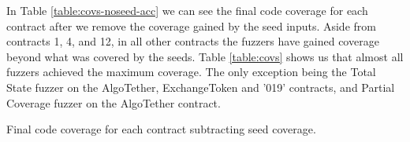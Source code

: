 In Table \ref{table:covs-noseed-acc} we can see the final code coverage for each contract after we remove the coverage gained by the seed inputs.
Aside from contracts 1, 4, and 12, in all other contracts the fuzzers have gained coverage beyond what was covered by the seeds.
Table \ref{table:covs} shows us that almost all fuzzers achieved the maximum coverage.
The only exception being the Total State fuzzer on the AlgoTether, ExchangeToken and '019' contracts, and Partial Coverage fuzzer on the AlgoTether contract.


\begin{table}[htbp]
    \centering
    \caption{Final code coverage for each contract subtracting seed coverage.}\label{table:covs-noseed-acc}
\end{table}
